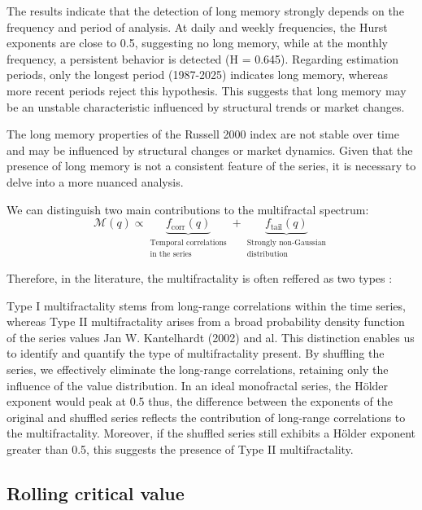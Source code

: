 \FloatBarrier

The results indicate that the detection of long memory strongly depends on the frequency and period of analysis.
At daily and weekly frequencies, the Hurst exponents are close to 0.5, suggesting no long memory, while at the monthly
frequency, a persistent behavior is detected (H = 0.645). Regarding estimation periods, only the longest period
(1987-2025) indicates long memory, whereas more recent periods reject this hypothesis. This suggests that long memory
may be an unstable characteristic influenced by structural trends or market changes.


The long memory properties of the Russell 2000 index are not stable over time and may be influenced by
structural changes or market dynamics. Given that the presence of long memory is not a consistent feature of the series,
it is necessary to delve into a more nuanced analysis.

We can distinguish two main contributions to the multifractal spectrum:
\[
\mathcal{M}(q) \propto \underbrace{f_{\text{corr}}(q)}_{\substack{\text{Temporal correlations} \\ \text{in the series}}} + \underbrace{f_{\text{tail}}(q)}_{\substack{\text{Strongly non-Gaussian} \\ \text{distribution}}}
\]

Therefore, in the literature, the multifractality is often reffered as two types :

Type I multifractality stems from long-range correlations within the time series, whereas Type II multifractality arises
from a broad probability density function of the series values Jan W. Kantelhardt (2002) and al. This distinction enables us to identify and quantify
the type of multifractality present. By shuffling the series, we effectively eliminate the long-range correlations,
retaining only the influence of the value distribution. In an ideal monofractal series, the Hölder exponent would peak
at 0.5 thus, the difference between the exponents of the original and shuffled series reflects the contribution of
long-range correlations to the multifractality. Moreover, if the shuffled series still exhibits a Hölder exponent
greater than 0.5, this suggests the presence of Type II multifractality.



\subsection{Rolling critical value}

